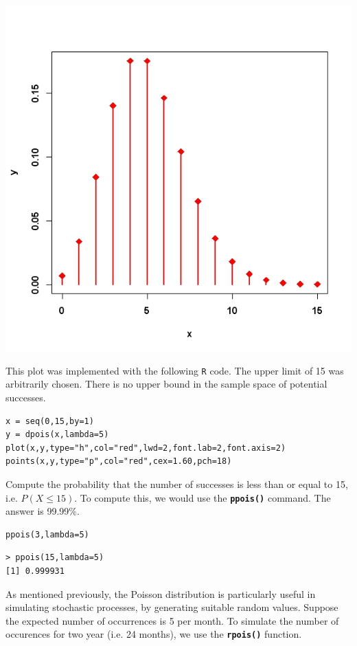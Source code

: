 \documentclass[a4paper,12pt]{article}
\begin{document}
 \begin{center}
 \includegraphics[scale=0.50]{dpoisPlot}
 \end{center}
 
This plot was implemented with the following \texttt{R} code.
The upper limit of 15 was arbitrarily chosen. There is no upper bound in the sample space of potential successes.

\begin{verbatim}
x = seq(0,15,by=1)
y = dpois(x,lambda=5)
plot(x,y,type="h",col="red",lwd=2,font.lab=2,font.axis=2)
points(x,y,type="p",col="red",cex=1.60,pch=18)
\end{verbatim}

Compute the probability that the number of successes is less than or equal to 15, i.e. $P(X \leq 15)$. To compute this, we would use the \textbf{\texttt{ppois()}} command. The answer is 99.99\%.


\begin{verbatim}
ppois(3,lambda=5)
\end{verbatim}

\begin{verbatim}
> ppois(15,lambda=5)
[1] 0.999931
\end{verbatim}

As mentioned previously, the Poisson distribution is particularly useful in simulating stochastic processes, by generating suitable random values.
Suppose the expected number of occurrences is 5 per month. To simulate the number of occurences for two year (i.e. 24 months), we use the \texttt{\textbf{rpois()}} function.
\end{document}
